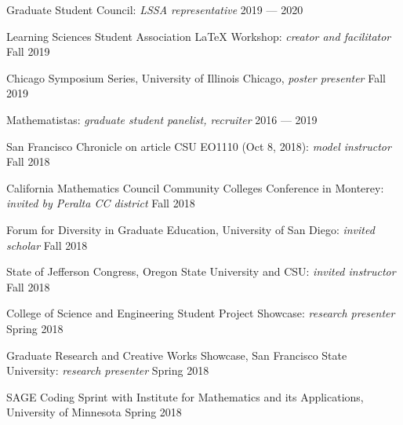 Graduate Student Council: \textit{LSSA representative}	\hfill 2019 --- 2020
 
Learning Sciences Student Association \LaTeX\; Workshop: \textit{creator and facilitator}	\hfill Fall 2019

Chicago Symposium Series, University of Illinois Chicago, \textit{poster presenter}	\hfill Fall 2019



Mathematistas: \textit{graduate student panelist, recruiter} \hfill  2016 --- 2019

San Francisco Chronicle on article CSU EO1110 (Oct 8, 2018): \textit{model instructor} \hfill Fall 2018

California Mathematics Council Community Colleges Conference in Monterey: \textit{invited by Peralta CC district}	\hfill Fall 2018

Forum for Diversity in Graduate Education, University of San Diego: \textit{invited scholar} \hfill	Fall 2018

State of Jefferson Congress, Oregon State University and CSU: \textit{invited instructor}	\hfill Fall 2018

College of Science and Engineering Student Project Showcase: \textit{research presenter}	\hfill Spring 2018

Graduate Research and Creative Works Showcase, San Francisco State University: \textit{research presenter}	\hfill Spring 2018

SAGE Coding Sprint with Institute for Mathematics and its Applications, University of Minnesota	\hfill Spring 2018


